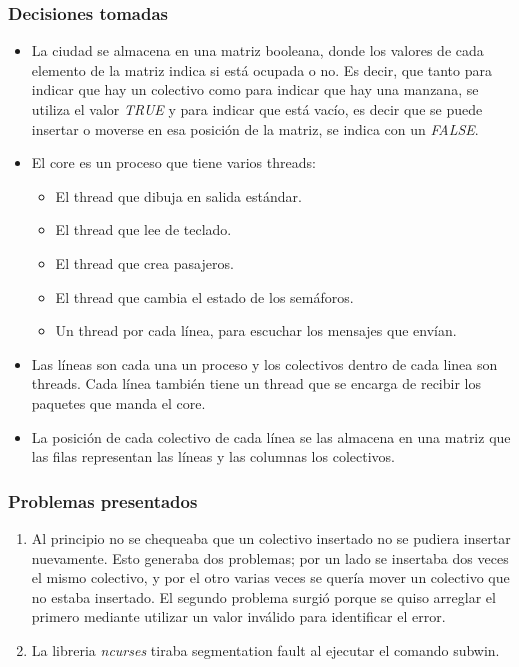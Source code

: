 \documentclass[a4paper,10pt]{elsart}
\begin{document}
\subsubsection{Decisiones tomadas}
\begin{itemize}
	\item La ciudad se almacena en una matriz booleana, donde los valores de cada elemento de la matriz indica si est\'a ocupada o no. Es decir, que tanto para indicar que hay un colectivo como para indicar que hay una manzana, se utiliza el valor \emph{TRUE} y para indicar que est\'a vac\'io, es decir que se puede insertar o moverse en esa posici\'on de la matriz, se indica con un \emph{FALSE}.
	\item El core es un proceso que tiene varios threads:
	\begin{itemize}
		\item El thread que dibuja en salida est\'andar.
		\item El thread que lee de teclado.
		\item El thread que crea pasajeros.
		\item El thread que cambia el estado de los sem\'aforos.
		\item Un thread por cada l\'inea, para escuchar los mensajes que env\'ian.
	\end{itemize}
	\item Las l\'ineas son cada una un proceso y los colectivos dentro de cada linea son threads. Cada l\'inea tambi\'en tiene un thread que se encarga de recibir los paquetes que manda el core.
	\item La posici\'on de cada colectivo de cada l\'inea se las almacena en una matriz que las filas representan las l\'ineas y las columnas los colectivos. 
\end{itemize}

\subsubsection{Problemas presentados}
\begin{enumerate}
	\item Al principio no se chequeaba que un colectivo insertado no se pudiera insertar nuevamente. Esto generaba dos problemas; por un lado se insertaba dos veces el mismo colectivo, y por el otro varias veces se quer\'ia mover un colectivo que no estaba insertado. El segundo problema surgi\'o porque se quiso arreglar el primero mediante utilizar un valor inv\'alido para identificar el error.
	\item La libreria \emph{ncurses} tiraba segmentation fault al ejecutar el comando subwin.
\end{enumerate}
\end{document}
